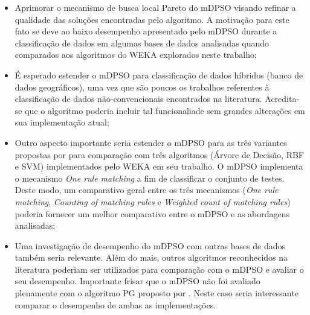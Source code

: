 \documentclass[
	12pt,				%
	openany,			%
	oneside,	
	a4paper,			%
	brazil,				%
	]{unimontes-ppgmsc-abntex2}
\begin{document}
\begin{itemize}
\item Aprimorar o mecanismo de busca local Pareto do mDPSO visando refinar a qualidade das soluções encontradas pelo algoritmo. A motivação para este fato se deve ao baixo desempenho apresentado pelo mDPSO durante a classificação de dados em algumas bases de dados analisadas quando comparados aos algoritmos do WEKA explorados neste trabalho;
\item É esperado estender o mDPSO para classificação de dados híbridos (banco de dados geográficos), uma vez que são poucos os trabalhos referentes à classificação de dados não-convencionais encontrados na literatura. Acredita-se que o algoritmo poderia incluir tal funcionaliade sem grandes alterações em sua implementação atual;
\item Outro aspecto importante seria estender o mDPSO para as três variantes propostas por  para comparação com três algoritmos (Árvore de Decisão, RBF e SVM) implementados pelo WEKA em seu trabalho. O mDPSO implementa o mecanismo {\em One rule matching} a fim de classificar o conjunto de testes. Deste modo, um comparativo geral entre os três mecanismos ({\em One rule matching}, {\em Counting of matching rules} e {\em Weighted count of matching rules}) poderia fornecer um melhor comparativo entre o mDPSO e as abordagens analisadas;
\item Uma investigação de desempenho do mDPSO com outras bases de dados também seria relevante. Além do mais, outros algoritmos reconhecidos na literatura poderiam ser utilizados para comparação com o mDPSO e avaliar o seu desempenho. Importante frisar que o mDPSO não foi avaliado plenamente com o algoritmo PG proposto por . Neste caso seria interessante comparar o desempenho de ambas as implementações.
\end{itemize}



\postextual

\renewcommand{\bibname}{Refer\^encias Bibliogr\'aficas}


\printindex
\end{document}
